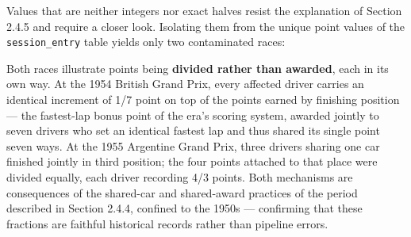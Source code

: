 \documentclass[
]{article}
\begin{document}
Values that are neither integers nor exact halves resist the explanation
of Section 2.4.5 and require a closer look. Isolating them from the
unique point values of the \texttt{session\_entry} table yields only two
contaminated races:

\begin{table}[!h]
\centering\begingroup\fontsize{8}{10}\selectfont

\endgroup{}
\end{table}

Both races illustrate points being \textbf{divided rather than awarded},
each in its own way. At the 1954 British Grand Prix, every affected
driver carries an identical increment of 1/7 point on top of the points
earned by finishing position --- the fastest-lap bonus point of the
era's scoring system, awarded jointly to seven drivers who set an
identical fastest lap and thus shared its single point seven ways. At
the 1955 Argentine Grand Prix, three drivers sharing one car finished
jointly in third position; the four points attached to that place were
divided equally, each driver recording 4/3 points. Both mechanisms are
consequences of the shared-car and shared-award practices of the period
described in Section 2.4.4, confined to the 1950s --- confirming that
these fractions are faithful historical records rather than pipeline
errors.
\end{document}

